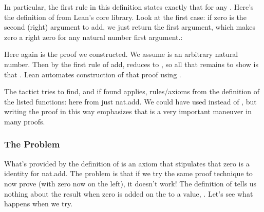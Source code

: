 \documentclass[letterpaper,10pt,english]{sphinxmanual}
\begin{document}
\sphinxAtStartPar
In particular, the first  rule in this definition states
exactly that for any . Here’s
the definition of  from Lean’s core library. Look
at the first case: if zero is the second (right) argument
to add, we just return the first argument, which makes
zero a right zero for any natural number first argument.:

\begin{sphinxVerbatim}[commandchars=\\\{\}]
       
         
         
\end{sphinxVerbatim}

\sphinxAtStartPar
Here again is the proof we constructed. We assume  is
an arbitrary natural number. Then by the first rule of add,
 reduces to , so all that remains to show
is that . Lean automates construction of that proof
using .

\begin{sphinxVerbatim}[commandchars=\\\{\}]
           
 
 \PYG{o}{[}\PYG{o}{]}
\end{sphinxVerbatim}

\sphinxAtStartPar
The  tactict tries to find, and if found applies,
rules/axioms from the definition of the listed functions:
here from just nat.add. We could have used  instead
of , but writing the proof in this way emphasizes
that  is a very important maneuver in many
proofs.


\subsubsection{The Problem}
\label{\detokenize{A_03_Recursive_Types:the-problem}}
\sphinxAtStartPar
What’s  provided by the definition of  is
an axiom that stipulates that zero is a  identity
for nat.add. The problem is that if we try the same proof
technique to now prove  (with zero now on
the left), it doesn’t work! The definition of 
tells us nothing about the result when zero is added on
the  to a value, . Let’s see what happens when
we try.
\end{document}
